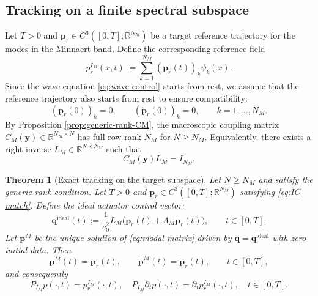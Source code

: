 \documentclass[11pt,a4paper]{article}
\numberwithin{equation}{section}
\newtheorem{theorem}{Theorem}[section]
\newcommand{\R}{\mathbb{R}}
\begin{document}

\subsection{Tracking on a finite spectral subspace}
\noindent
Let $T>0$ and $\bm{p}_r\in C^3([0,T];\R^{N_M})$ be a target reference trajectory for the modes in the Minnaert band. Define the corresponding reference field
\[
 p_r^{I_M}(x,t):=\sum_{k=1}^{N_M} (\bm{p}_r(t))_k\psi_k(x).
\]
Since the wave equation \eqref{eq:wave-control} starts from rest, we assume that the reference trajectory also starts from rest to ensure compatibility:
\begin{equation}
\label{eq:IC-match}
 (\bm{p}_r(0))_k=0,\qquad
 (\dot{\bm{p}}_r(0))_k= 0,\qquad k=1,\dots,N_M.
\end{equation}
\noindent
By Proposition \ref{prop:generic-rank-CM}, the macroscopic coupling matrix $C_M(\mathbf y)\in\mathbb R^{N_M\times N}$ has full row rank $N_M$ for $N\ge N_M$. Equivalently, there exists a right inverse $L_M\in\mathbb R^{N\times N_M}$ such that
\[
 C_M(\mathbf y)L_M=I_{N_M}.
\]

\begin{theorem}[Exact tracking on the target subspace]
\label{thm:finite-tracking}
Let $N \ge N_M$ and satisfy the generic rank condition. Let $T>0$ and $\bm{p}_r\in C^3([0,T];\R^{N_M})$ satisfying \eqref{eq:IC-match}. Define the ideal actuator control vector:
\begin{equation}
\label{eq:control-ideal}
 \mathbf{q}^{\mathrm{ideal}}(t):=\frac{1}{c_0^2} L_M \bigl(\ddot{\bm{p}}_r(t)+\Lambda_M\bm{p}_r(t)\bigr),\qquad t\in[0,T].
\end{equation}
Let $\bm{p}^M$ be the unique solution of \eqref{eq:modal-matrix} driven by $\mathbf{q}=\mathbf{q}^{\mathrm{ideal}}$ with zero initial data. Then
\[
 \bm{p}^M(t)=\bm{p}_r(t),\qquad
 \dot{\bm{p}}^M(t)=\dot{\bm{p}}_r(t),\qquad t\in[0,T],
\]
and consequently
\[
 P_{I_M} p(\cdot,t)=p_r^{I_M}(\cdot,t),\quad
 P_{I_M}\partial_t p(\cdot,t)=\partial_t p_r^{I_M}(\cdot,t),\quad t\in[0,T].
\]
\end{theorem}
\end{document}
